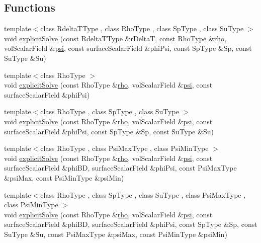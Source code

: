 \subsection*{Functions}
\begin{DoxyCompactItemize}
\item 
{\footnotesize template$<$class Rdelta\+T\+Type , class Rho\+Type , class Sp\+Type , class Su\+Type $>$ }\\void \hyperlink{namespaceFoam_1_1myMULES_a62d251545cddb4d8e55512c4a86dcabf}{explicit\+Solve} (const Rdelta\+T\+Type \&r\+DeltaT, const Rho\+Type \&\hyperlink{EEqn__1pl_8H_ac955f87ac2b79f02f420cae087fc52b1}{rho}, vol\+Scalar\+Field \&\hyperlink{UEqn__1pl_8H_a165a34deec3ee505598e511a88831968}{psi}, const surface\+Scalar\+Field \&phi\+Psi, const Sp\+Type \&Sp, const Su\+Type \&Su)
\item 
{\footnotesize template$<$class Rho\+Type $>$ }\\void \hyperlink{namespaceFoam_1_1myMULES_a1ce91b0273238f6ddf198f582a9fd806}{explicit\+Solve} (const Rho\+Type \&\hyperlink{EEqn__1pl_8H_ac955f87ac2b79f02f420cae087fc52b1}{rho}, vol\+Scalar\+Field \&\hyperlink{UEqn__1pl_8H_a165a34deec3ee505598e511a88831968}{psi}, const surface\+Scalar\+Field \&phi\+Psi)
\item 
{\footnotesize template$<$class Rho\+Type , class Sp\+Type , class Su\+Type $>$ }\\void \hyperlink{namespaceFoam_1_1myMULES_ad80f7a3f7f83c1be0a382eb457325995}{explicit\+Solve} (const Rho\+Type \&\hyperlink{EEqn__1pl_8H_ac955f87ac2b79f02f420cae087fc52b1}{rho}, vol\+Scalar\+Field \&\hyperlink{UEqn__1pl_8H_a165a34deec3ee505598e511a88831968}{psi}, const surface\+Scalar\+Field \&phi\+Psi, const Sp\+Type \&Sp, const Su\+Type \&Su)
\item 
{\footnotesize template$<$class Rho\+Type , class Psi\+Max\+Type , class Psi\+Min\+Type $>$ }\\void \hyperlink{namespaceFoam_1_1myMULES_a408d6816b699a04ddd3b290bebe08748}{explicit\+Solve} (const Rho\+Type \&\hyperlink{EEqn__1pl_8H_ac955f87ac2b79f02f420cae087fc52b1}{rho}, vol\+Scalar\+Field \&\hyperlink{UEqn__1pl_8H_a165a34deec3ee505598e511a88831968}{psi}, const surface\+Scalar\+Field \&phi\+BD, surface\+Scalar\+Field \&phi\+Psi, const Psi\+Max\+Type \&psi\+Max, const Psi\+Min\+Type \&psi\+Min)
\item 
{\footnotesize template$<$class Rho\+Type , class Sp\+Type , class Su\+Type , class Psi\+Max\+Type , class Psi\+Min\+Type $>$ }\\void \hyperlink{namespaceFoam_1_1myMULES_adcc09177637dadb5c0559fc394677707}{explicit\+Solve} (const Rho\+Type \&\hyperlink{EEqn__1pl_8H_ac955f87ac2b79f02f420cae087fc52b1}{rho}, vol\+Scalar\+Field \&\hyperlink{UEqn__1pl_8H_a165a34deec3ee505598e511a88831968}{psi}, const surface\+Scalar\+Field \&phi\+BD, surface\+Scalar\+Field \&phi\+Psi, const Sp\+Type \&Sp, const Su\+Type \&Su, const Psi\+Max\+Type \&psi\+Max, const Psi\+Min\+Type \&psi\+Min)

\end{DoxyCompactItemize}
